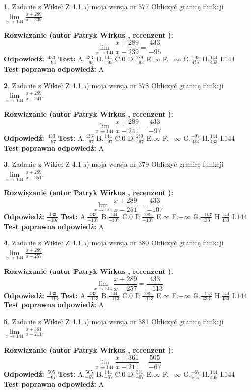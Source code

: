 \documentclass[12pt, a4paper]{article}
\theoremstyle{definition} %
\newtheorem{zad}{}
\newcommand{\zadStart}[1]{\begin{zad}#1\newline}
\newcommand{\zadStop}{\end{zad}}
\newcommand{\rozwStart}[2]{\noindent \textbf{Rozwiązanie (autor #1 , recenzent #2): }\newline}
\newcommand{\rozwStop}{\newline}
\newcommand{\odpStart}{\noindent \textbf{Odpowiedź:}\newline}
\newcommand{\odpStop}{\newline}
\newcommand{\testStart}{\noindent \textbf{Test:}\newline}
\newcommand{\testStop}{\newline}
\newcommand{\kluczStart}{\noindent \textbf{Test poprawna odpowiedź:}\newline}
\newcommand{\kluczStop}{\newline}
\begin{document}
\zadStart{Zadanie z Wikieł Z 4.1 a) moja wersja nr 377}
Obliczyć granicę funkcji $\lim\limits_{x\to144}\frac{x+289}{x-239}$.
\zadStop
\rozwStart{Patryk Wirkus}{}
$$\lim\limits_{x\to144}\frac{x+289}{x-239} = \frac{433}{-95}$$
\rozwStop
\odpStart
$\frac{433}{-95}$
\odpStop
\testStart
A.$\frac{433}{-95}$
B.$\frac{144}{-95}$
C.$0$
D.$\frac{289}{-95}$
E.$\infty$
F.$-\infty$
G.$\frac{-95}{433}$
H.$\frac{144}{433}$
I.$144$
\testStop
\kluczStart
A
\kluczStop



\zadStart{Zadanie z Wikieł Z 4.1 a) moja wersja nr 378}
Obliczyć granicę funkcji $\lim\limits_{x\to144}\frac{x+289}{x-241}$.
\zadStop
\rozwStart{Patryk Wirkus}{}
$$\lim\limits_{x\to144}\frac{x+289}{x-241} = \frac{433}{-97}$$
\rozwStop
\odpStart
$\frac{433}{-97}$
\odpStop
\testStart
A.$\frac{433}{-97}$
B.$\frac{144}{-97}$
C.$0$
D.$\frac{289}{-97}$
E.$\infty$
F.$-\infty$
G.$\frac{-97}{433}$
H.$\frac{144}{433}$
I.$144$
\testStop
\kluczStart
A
\kluczStop



\zadStart{Zadanie z Wikieł Z 4.1 a) moja wersja nr 379}
Obliczyć granicę funkcji $\lim\limits_{x\to144}\frac{x+289}{x-251}$.
\zadStop
\rozwStart{Patryk Wirkus}{}
$$\lim\limits_{x\to144}\frac{x+289}{x-251} = \frac{433}{-107}$$
\rozwStop
\odpStart
$\frac{433}{-107}$
\odpStop
\testStart
A.$\frac{433}{-107}$
B.$\frac{144}{-107}$
C.$0$
D.$\frac{289}{-107}$
E.$\infty$
F.$-\infty$
G.$\frac{-107}{433}$
H.$\frac{144}{433}$
I.$144$
\testStop
\kluczStart
A
\kluczStop



\zadStart{Zadanie z Wikieł Z 4.1 a) moja wersja nr 380}
Obliczyć granicę funkcji $\lim\limits_{x\to144}\frac{x+289}{x-257}$.
\zadStop
\rozwStart{Patryk Wirkus}{}
$$\lim\limits_{x\to144}\frac{x+289}{x-257} = \frac{433}{-113}$$
\rozwStop
\odpStart
$\frac{433}{-113}$
\odpStop
\testStart
A.$\frac{433}{-113}$
B.$\frac{144}{-113}$
C.$0$
D.$\frac{289}{-113}$
E.$\infty$
F.$-\infty$
G.$\frac{-113}{433}$
H.$\frac{144}{433}$
I.$144$
\testStop
\kluczStart
A
\kluczStop



\zadStart{Zadanie z Wikieł Z 4.1 a) moja wersja nr 381}
Obliczyć granicę funkcji $\lim\limits_{x\to144}\frac{x+361}{x-211}$.
\zadStop
\rozwStart{Patryk Wirkus}{}
$$\lim\limits_{x\to144}\frac{x+361}{x-211} = \frac{505}{-67}$$
\rozwStop
\odpStart
$\frac{505}{-67}$
\odpStop
\testStart
A.$\frac{505}{-67}$
B.$\frac{144}{-67}$
C.$0$
D.$\frac{361}{-67}$
E.$\infty$
F.$-\infty$
G.$\frac{-67}{505}$
H.$\frac{144}{505}$
I.$144$
\testStop
\kluczStart
A
\kluczStop
\end{document}
